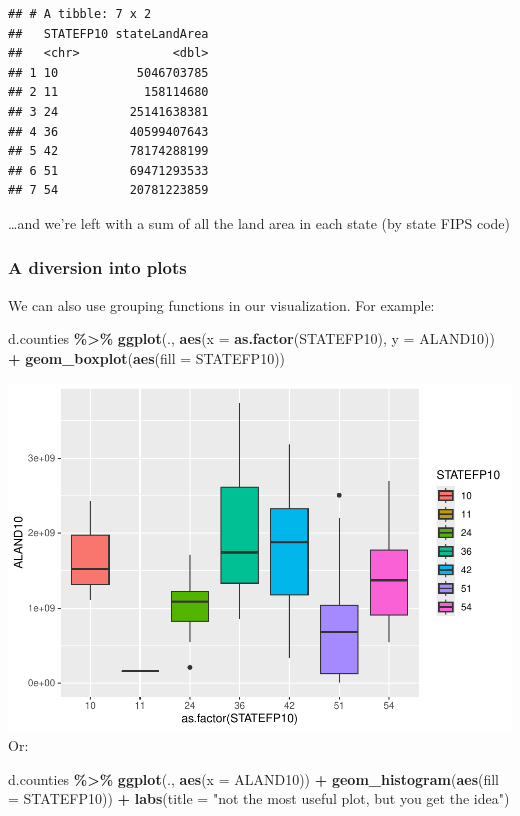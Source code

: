 \documentclass[]{article}
\newenvironment{Shaded}{\begin{snugshade}}{\end{snugshade}}
\newcommand{\AttributeTok}[1]{\textcolor[rgb]{0.13,0.29,0.53}{#1}}
\newcommand{\FunctionTok}[1]{\textcolor[rgb]{0.13,0.29,0.53}{\textbf{#1}}}
\newcommand{\NormalTok}[1]{#1}
\newcommand{\SpecialCharTok}[1]{\textcolor[rgb]{0.81,0.36,0.00}{\textbf{#1}}}
\newcommand{\StringTok}[1]{\textcolor[rgb]{0.31,0.60,0.02}{#1}}
\begin{document}
\begin{verbatim}
## # A tibble: 7 x 2
##   STATEFP10 stateLandArea
##   <chr>             <dbl>
## 1 10           5046703785
## 2 11            158114680
## 3 24          25141638381
## 4 36          40599407643
## 5 42          78174288199
## 6 51          69471293533
## 7 54          20781223859
\end{verbatim}

\ldots and we're left with a sum of all the land area in each state (by
state FIPS code)

\subsubsection{A diversion into plots}\label{a-diversion-into-plots}

We can also use grouping functions in our visualization. For example:

\begin{Shaded}
\begin{Highlighting}[]
\NormalTok{d.counties }\SpecialCharTok{\%\textgreater{}\%} 
  \FunctionTok{ggplot}\NormalTok{(., }\FunctionTok{aes}\NormalTok{(}\AttributeTok{x =} \FunctionTok{as.factor}\NormalTok{(STATEFP10), }\AttributeTok{y =}\NormalTok{ ALAND10)) }\SpecialCharTok{+}
  \FunctionTok{geom\_boxplot}\NormalTok{(}\FunctionTok{aes}\NormalTok{(}\AttributeTok{fill =}\NormalTok{ STATEFP10))}
\end{Highlighting}
\end{Shaded}

\includegraphics{lab01_files/figure-latex/plots-1.pdf} Or:

\begin{Shaded}
\begin{Highlighting}[]
\NormalTok{d.counties }\SpecialCharTok{\%\textgreater{}\%} 
  \FunctionTok{ggplot}\NormalTok{(., }\FunctionTok{aes}\NormalTok{(}\AttributeTok{x =}\NormalTok{ ALAND10)) }\SpecialCharTok{+}
  \FunctionTok{geom\_histogram}\NormalTok{(}\FunctionTok{aes}\NormalTok{(}\AttributeTok{fill =}\NormalTok{ STATEFP10)) }\SpecialCharTok{+}
  \FunctionTok{labs}\NormalTok{(}\AttributeTok{title =} \StringTok{"not the most useful plot, but you get the idea"}\NormalTok{)}
\end{Highlighting}
\end{Shaded}
\end{document}

